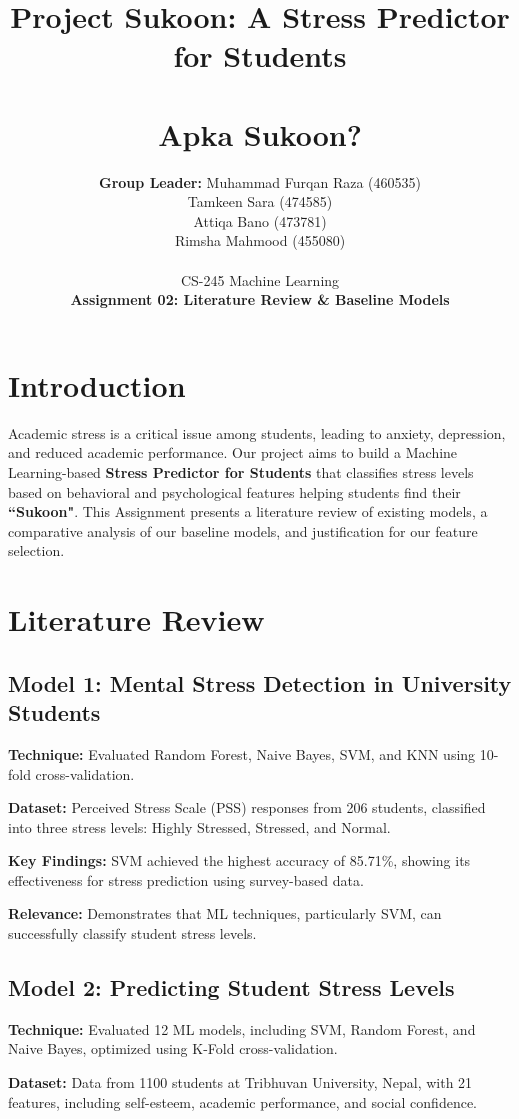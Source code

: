 \documentclass[a4paper,11pt]{article}
\title{\textbf{Project Sukoon: A Stress Predictor for Students} \\ \\[0.3cm] \large \textbf{Apka Sukoon?} }
\author{
  \textbf{Group Leader:} Muhammad Furqan Raza (460535)\\
  Tamkeen Sara (474585) \\
  Attiqa Bano (473781) \\
  Rimsha Mahmood (455080) \\
  \\CS-245 Machine Learning\\ 
  \textbf{Assignment 02: Literature Review \& Baseline Models}
}
\date{}
\begin{document}
\maketitle

\section{Introduction}
Academic stress is a critical issue among students, leading to anxiety, depression, and reduced academic performance. Our project aims to build a Machine Learning-based \textbf{Stress Predictor for Students} that classifies stress levels based on behavioral and psychological features helping students find their \textbf{``Sukoon"}. This Assignment presents a literature review of existing models, a comparative analysis of our baseline models, and justification for our feature selection.

\section{Literature Review}

\subsection{Model 1: Mental Stress Detection in University Students}

\noindent \textbf{Technique:} Evaluated Random Forest, Naive Bayes, SVM, and KNN using 10-fold cross-validation.

\noindent \textbf{Dataset:} Perceived Stress Scale (PSS) responses from 206 students, classified into three stress levels: Highly Stressed, Stressed, and Normal.

\noindent \textbf{Key Findings:} SVM achieved the highest accuracy of 85.71\%, showing its effectiveness for stress prediction using survey-based data.

\noindent \textbf{Relevance:} Demonstrates that ML techniques, particularly SVM, can successfully classify student stress levels.

\subsection{Model 2: Predicting Student Stress Levels}

\noindent \textbf{Technique:} Evaluated 12 ML models, including SVM, Random Forest, and Naive Bayes, optimized using K-Fold cross-validation.

\noindent \textbf{Dataset:} Data from 1100 students at Tribhuvan University, Nepal, with 21 features, including self-esteem, academic performance, and social confidence.
\end{document}
